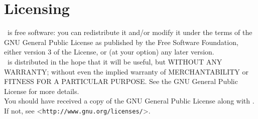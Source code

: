 \chapter*{Licensing}
%
%
%
\packver\ is free software: you can redistribute it and/or modify
it under the terms of the GNU General Public License as published by
the Free Software Foundation, either version 3 of the License, or
(at your option) any later version.\\

\packver\ is distributed in the hope that it will be useful,
but WITHOUT ANY WARRANTY; without even the implied warranty of
MERCHANTABILITY or FITNESS FOR A PARTICULAR PURPOSE.  See the
GNU General Public License for more details.\\

You should have received a copy of the GNU General Public License
along with \linebreak\packver.  If not, see <\texttt{http://www.gnu.org/licenses/}>.\\

\clearpage


